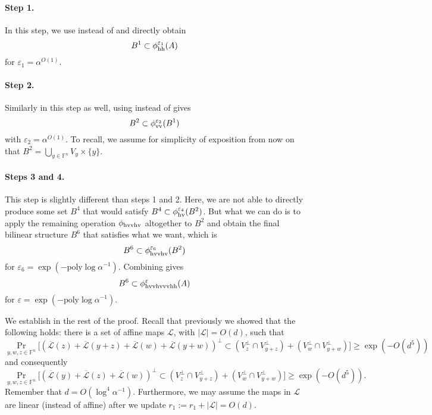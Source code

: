 \documentclass[12pt]{article}
\newcommand{\F}{\mathbb{F}}
\newcommand{\hr}{\textup{h}}
\newcommand{\vr}{\textup{v}}
\newcommand{\LL}{\mathcal{L}}
\newcommand{\eps}{\varepsilon}
\newcommand{\poly}{\textrm{poly}}
\begin{document}
\paragraph{Step 1.}
	In this step, we use  instead of  and directly obtain
\begin{equation}\label{equation:firststep}
	B^1 \subset \phi^{\eps_1}_{\hr\hr}(A)
\end{equation}
	for $\eps_1 = \alpha^{O(1)}$.
\paragraph{Step 2.}
	Similarly in this step as well, using  instead of  gives
\begin{equation}\label{equation:secondstep}	
	B^2 \subset \phi^{\eps_2}_{\vr\vr}(B^1)
\end{equation}
    with $\eps_2 = \alpha^{O(1)}$.
	To recall, we assume for simplicity of exposition from now on that $B^2 = \bigcup_{y \in \F^n} V_y \times \{y\}$.
\paragraph{Steps 3 and 4.}
This step is slightly different than steps 1 and 2. Here, we are not able to directly produce some set $B^4$ that would satisfy $B^4 \subset \phi_{\hr\vr}^{\eps_4}(B^2)$. But what we can do is to apply the remaining operation $\phi_{\hr\vr\vr\hr\vr}$ altogether to $B^2$ and obtain the final bilinear structure $B^6$ that satisfies what we want, which is
\begin{equation}\label{equation:thirdstep}	
	B^6 \subset \phi_{\hr\vr\vr\hr\vr}^{\eps_6}(B^2)
\end{equation}
for $\eps_6 = \exp(-\poly \log\alpha^{-1})$.
Combining   gives
$$B^6\subset  \phi_{\hr\vr\vr\hr\vr\vr\vr\hr\hr}^{\eps}(A)$$
for $\eps = \exp(-\poly \log\alpha^{-1})$.

We establish  in the rest of the proof.
Recall that previously we showed that the following holds: there is a set of affine maps $\LL$, with $|\LL|= O(d)$, such that
$$
\Pr_{y,w,z\in \F^n} \bigg[ \left( \overline{\LL}(z) + \overline{\LL}(y+z) + \overline{\LL}(w) +\overline{\LL}(y+w) \right)^\perp \subset \left( V^\perp_{z}\cap V^\perp_{y+z} \right) + \left( V^\perp_{w} \cap V^\perp_{y+w} \right)    \bigg] \ge \exp(-O(d^5))
$$
and consequently
$$
\Pr_{y,w,z\in \F^n} \bigg[ \left( \overline{\LL}(y) + \overline{\LL}(z) + \overline{\LL}(w)  \right)^\perp \subset \left( V^\perp_{z}\cap V^\perp_{y+z} \right) + \left( V^\perp_{w} \cap V^\perp_{y+w} \right)    \bigg] \ge \exp(-O(d^5)).
$$
Remember that $d = O(\log^4 \alpha^{-1})$.
Furthermore, we may assume the maps in $\LL$ are linear (instead of affine) after we update $r_1:= r_1+|\LL| = O(d)$.
\end{document}
